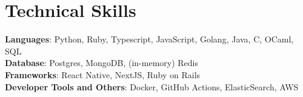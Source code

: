 \documentclass[letterpaper,11pt]{article}
\begin{document}
\section{Technical Skills}
 \begin{itemize}[leftmargin=0.15in, label={}]
    \small{\item{
     \textbf{Languages}{: Python, Ruby, Typescript, JavaScript, Golang, Java, C, OCaml, SQL} \\
     \textbf{Database}{: Postgres, MongoDB, (in-memory) Redis} \\
     \textbf{Frameworks}{: React Native, NextJS, Ruby on Rails} \\
     \textbf{Developer Tools and Others}{: Docker, GitHub Actions, ElasticSearch, AWS}
    }}
 \end{itemize}

\end{document}

